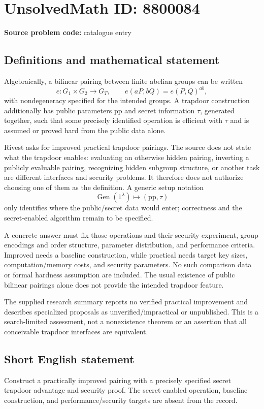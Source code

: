 \documentclass[11pt]{article}
\begin{document}
\section*{UnsolvedMath ID: 8800084}
\textbf{Source problem code:} catalogue entry
\subsection{Definitions and mathematical statement}
Algebraically, a bilinear pairing between finite abelian groups can be written
\[
e:G_1\times G_2\to G_T,\qquad
 e(aP,bQ)=e(P,Q)^{ab},
\]
with nondegeneracy specified for the intended groups. A trapdoor construction additionally has public parameters \(\mathrm{pp}\) and secret information \(\tau\), generated together, such that some precisely identified operation is efficient with \(\tau\) and is assumed or proved hard from the public data alone.

Rivest asks for improved practical trapdoor pairings. The source does not state what the trapdoor enables: evaluating an otherwise hidden pairing, inverting a publicly evaluable pairing, recognizing hidden subgroup structure, or another task are different interfaces and security problems. It therefore does not authorize choosing one of them as the definition. A generic setup notation
\[
\operatorname{Gen}(1^\lambda)\longmapsto(\mathrm{pp},\tau)
\]
only identifies where the public/secret data would enter; correctness and the secret-enabled algorithm remain to be specified.

A concrete answer must fix those operations and their security experiment, group encodings and order structure, parameter distribution, and performance criteria. Improved needs a baseline construction, while practical needs target key sizes, computation/memory costs, and security parameters. No such comparison data or formal hardness assumption are included. The usual existence of public bilinear pairings alone does not provide the intended trapdoor feature.

The supplied research summary reports no verified practical improvement and describes specialized proposals as unverified/impractical or unpublished. This is a search-limited assessment, not a nonexistence theorem or an assertion that all conceivable trapdoor interfaces are equivalent.
\subsection{Short English statement}
Construct a practically improved pairing with a precisely specified secret trapdoor advantage and security proof. The secret-enabled operation, baseline construction, and performance/security targets are absent from the record.
\end{document}
